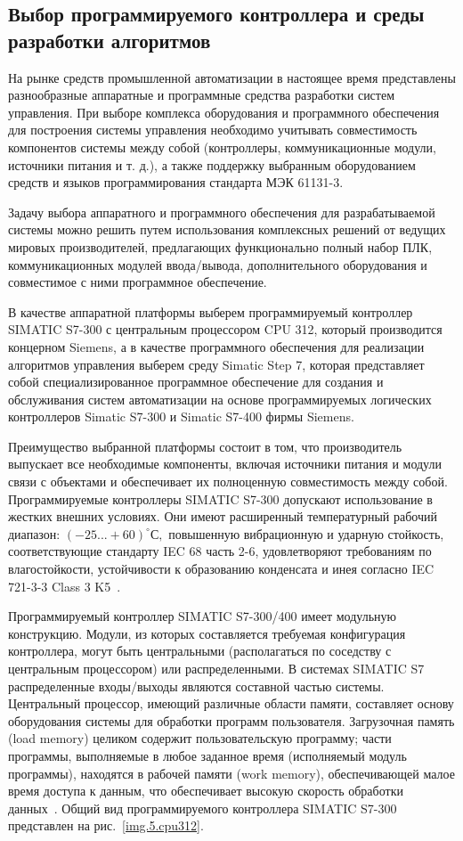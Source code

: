 \subsection{Выбор программируемого контроллера и среды разработки алгоритмов} \label{subsect5_2_1}

На рынке средств промышленной автоматизации в настоящее время представлены разнообразные аппаратные и программные средства разработки систем управления. При выборе комплекса оборудования и программного обеспечения для построения системы управления необходимо учитывать совместимость компонентов системы между собой (контроллеры, коммуникационные модули, источники питания и т. д.), а также поддержку выбранным оборудованием средств и языков программирования стандарта МЭК 61131-3.

Задачу выбора аппаратного и программного обеспечения для разрабатываемой системы можно решить путем использования комплексных решений от ведущих мировых производителей, предлагающих функционально полный набор ПЛК, коммуникационных модулей ввода/вывода, дополнительного оборудования и совместимое с ними программное обеспечение.

В качестве аппаратной платформы выберем программируемый контроллер SIMATIC S7-300 с центральным процессором CPU 312, который производится концерном Siemens, а в качестве программного обеспечения для реализации алгоритмов управления выберем среду Simatic Step 7, которая представляет собой специализированное программное обеспечение для создания и обслуживания систем автоматизации на основе программируемых логических контроллеров Simatic S7-300 и Simatic S7-400 фирмы Siemens.

Преимущество выбранной платформы состоит в том, что производитель выпускает все необходимые компоненты, включая источники питания и модули связи с объектами и обеспечивает их полноценную совместимость между собой.\\

Программируемые контроллеры SIMATIC S7-300 допускают  использование  в  жестких  внешних условиях.  Они  имеют  расширенный  температурный  рабочий  диапазон: $ (-25...+60)^\circ С, $ повышенную  вибрационную  и  ударную  стойкость, соответствующие стандарту IEC 68 часть 2-6, удовлетворяют требованиям по влагостойкости, устойчивости к образованию конденсата и инея согласно IEC 721-3-3 Class 3 K5~\cite{siemens2}.

Программируемый контроллер SIMATIC S7-300/400 имеет модульную конструкцию. Модули, из которых составляется требуемая конфигурация контроллера, могут быть центральными (располагаться по соседству с центральным процессором) или распределенными. В системах SIMATIC S7 распределенные  входы/выходы являются составной частью системы. Центральный процессор, имеющий различные области памяти, составляет основу оборудования системы для обработки программ пользователя. Загрузочная память (load memory) целиком содержит пользовательскую программу; части программы, выполняемые в любое заданное время (исполняемый модуль программы), находятся в рабочей памяти (work memory), обеспечивающей малое время доступа к данным, что обеспечивает высокую скорость обработки данных~\cite{siemens2}. Общий вид программируемого контроллера SIMATIC S7-300 представлен на рис.~\ref{img.5.cpu312}.

